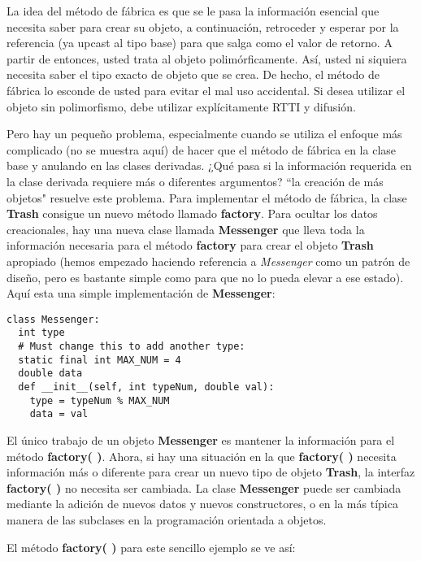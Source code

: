 La idea del método de fábrica es que se le pasa la información esencial que necesita saber para crear su objeto, a continuación, retroceder y esperar por la referencia (ya upcast al tipo base) para que salga como el valor de retorno.  A partir de entonces, usted trata al objeto polimórficamente. Así, usted ni siquiera necesita saber el tipo exacto de objeto que se crea. De hecho, el método de fábrica lo esconde de usted para evitar el mal uso accidental. Si desea utilizar el objeto sin polimorfismo, debe utilizar explícitamente RTTI y difusión.    \newline

Pero hay un pequeño problema, especialmente cuando se utiliza el enfoque más complicado (no se muestra aquí) de hacer que el método de fábrica en la clase base y anulando en las clases derivadas. ¿Qué pasa si la información requerida en la clase derivada requiere más o diferentes argumentos? “la creación de más objetos" resuelve este problema. Para implementar el método de fábrica, la clase \textbf{Trash} consigue un nuevo método llamado \textbf{factory}. Para ocultar los datos creacionales, hay una nueva clase llamada \textbf{Messenger} que lleva toda la información necesaria para el método \textbf{factory} para crear el objeto \textbf{Trash} apropiado (hemos empezado haciendo referencia a \textit{Messenger} como un patrón de diseño, pero es bastante simple como para que no lo pueda elevar a ese estado). Aquí esta una simple implementación de \textbf{Messenger}:     \newline

\begin{lstlisting}
class Messenger: 
  int type 
  # Must change this to add another type: 
  static final int MAX_NUM = 4 
  double data 
  def __init__(self, int typeNum, double val): 
    type = typeNum % MAX_NUM 
    data = val 
\end{lstlisting}

El único trabajo de un objeto \textbf{Messenger} es mantener la información para el método \textbf{factory( )}. Ahora, si hay una situación en la que \textbf{factory( )} necesita información más o diferente para crear un nuevo tipo de objeto \textbf{Trash}, la interfaz \textbf{factory( )} no necesita ser cambiada. La clase \textbf{Messenger} puede ser cambiada mediante la adición de nuevos datos y nuevos constructores, o en la más típica manera de las subclases en la programación orientada a objetos.   \newline

El método \textbf{factory( )} para este sencillo ejemplo se ve así:     \newline


